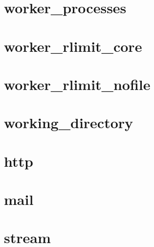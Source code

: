 \chapter{worker\_processes}


\chapter{worker\_rlimit\_core}


\chapter{worker\_rlimit\_nofile}


\chapter{working\_directory}


\chapter{http}


\chapter{mail}


\chapter{stream}

